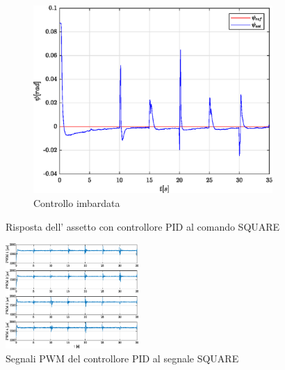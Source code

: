 \begin{figure}
	\hfill
	\begin{subfigure}{0.45\textwidth}
		\centering
		\includegraphics[width=1\textwidth]{Simulazioni/Figure/PID/SQUARE/AttitudeControlYaw}
		\caption{Controllo imbardata}
		\label{fig:SQUAREerryawPID}
	\end{subfigure}
	\caption{Risposta dell' assetto con controllore PID al comando SQUARE}
\end{figure}


\begin{figure}
	\centering
	\includegraphics[width=0.45\textwidth]{Simulazioni/Figure/PID/SQUARE/PWM}
	\caption{Segnali PWM del controllore PID al segnale SQUARE}
	\label{fig:SQUAREPWMPID}
\end{figure}

